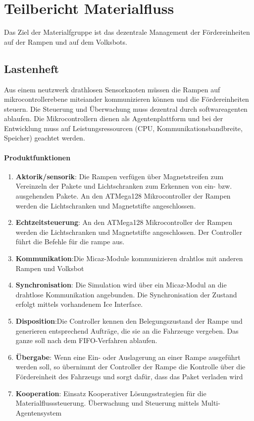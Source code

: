 \section{Teilbericht Materialfluss}
Das Ziel der Materialfgruppe ist das dezentrale Management der Fördereinheiten auf der Rampen und auf dem Volksbots.
\subsection{Lastenheft}
Aus einem neutzwerk drathlosen Sensorknoten müssen die Rampen auf mikrocontrollerebene miteiander kommunizieren können und die Fördereinheiten steuern.
Die Steuerung und Überwachung muss dezentral durch softwareagenten ablaufen. Die Mikrocontrollern dienen als Agentenplattform und bei der Entwicklung muss 
auf Leistungsressourcen (CPU, Kommunikationsbandbreite, Speicher) geachtet werden.
\paragraph{Produktfunktionen}
\begin{enumerate}
 \item \textbf{Aktorik/sensorik}: Die Rampen verfügen über Magnetstreifen zum Vereinzeln der Pakete und Lichtschranken 
 zum Erkennen von ein- bzw. ausgehenden Pakete. An den ATMega128 Mikrocontroller der Rampen werden die Lichtschranken und Magnetstifte angeschlossen.
 \item \textbf{Echtzeitsteuerung}: An den ATMega128 Mikrocontroller der Rampen werden die Lichtschranken und Magnetstifte angeschlossen. Der Controller führt die
 Befehle für die rampe aus. 
 \item \textbf{Kommunikation}:Die Micaz-Module kommunizieren drahtlos mit anderen Rampen und Volksbot
 \item \textbf{Synchronisation}: Die Simulation wird über ein Micaz-Modul an die drahtlose Kommunikation angebunden. Die Synchronisation der Zustand erfolgt
  mittels vorhandenem Ice Interface.
 \item \textbf{Disposition}:Die Controller kennen den Belegungszustand der Rampe und generieren entsprechend Aufträge, die sie an die Fahrzeuge vergeben. 
 Das ganze soll nach dem FIFO-Verfahren ablaufen.
 \item \textbf{Übergabe}: Wenn eine Ein- oder Auslagerung an einer Rampe ausgeführt werden soll, so übernimmt der Controller der Rampe die Kontrolle
 über die Fördereinheit des Fahrzeugs und sorgt dafür, dass das Paket verladen wird
 \item \textbf{Kooperation}: Einsatz Kooperativer Lösungsstrategien für die Materialflusssteuerung. Überwachung und Steuerung mittels Multi-Agentensystem
\end{enumerate}

